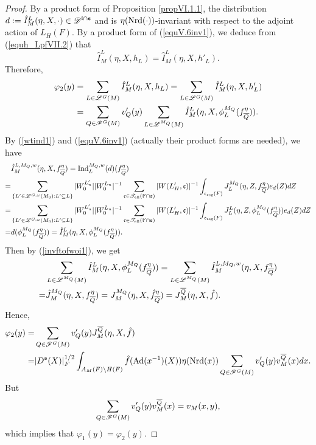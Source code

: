 \documentclass[a4paper]{amsart}
\newcommand{\ov}{\overline}
\theoremstyle{definition}
\theoremstyle{remark}
\numberwithin{equation}{subsection}
\begin{document}
\begin{proof}
By a product form of Proposition \ref{propVI.1.1}, the distribution $d:=\hat{I}_M^L(\eta, X, \cdot)\in\mathscr{D}^{{\mathfrak{l}}\cap{\mathfrak{s}}}$ and is $\eta({\mathrm{Nrd}}(\cdot))$-invariant with respect to the adjoint action of $L_H(F)$. By a product form of (\ref{equV.6inv1}), we deduce from (\ref{equh_LpfVII.2}) that
$$ \hat{I}_M^L(\eta, X, h_L)=\hat{I}_M^L(\eta, X, h'_L). $$
Therefore, 
\[\begin{split}
 \varphi_2(y)&=\sum_{L\in\msl^G(M)} \hat{I}_M^L(\eta, X, h_L)=\sum_{L\in\msl^G(M)} \hat{I}_M^L(\eta, X, h'_L) \\
&=\sum_{Q\in\msf^G(M)} v'_Q(y) \sum_{L\in\msl^{M_Q}(M)} \hat{I}_M^L(\eta, X, \phi_L^{M_Q}(f_{\ov{Q}}^\eta)). 
\end{split}\]
By (\ref{wtind1}) and (\ref{equV.6inv1}) (actually their product forms are needed), we have
\[\begin{split}
&\hat{I}_M^{L, M_Q, w}(\eta, X, f_{\ov{Q}}^\eta)=\Ind_L^{M_Q,w}(d)(f_{\ov{Q}}^\eta) \\
=&\sum_{\{L'\in\msl^{G,\omega}(M_0): L'\subseteq L\}} |W_0^{L'_n}| |W_0^{L_n}|^{-1} \sum_{\fc\in\mst_\el(\fl'\cap\fs)} |W(L'_H, \fc)|^{-1} \int_{\fc_\reg(F)} J_L^{M_Q}(\eta, Z, f_{\ov{Q}}^\eta) e_d(Z) dZ \\
=&\sum_{\{L'\in\msl^{G,\omega}(M_0): L'\subseteq L\}} |W_0^{L'_n}| |W_0^{L_n}|^{-1} \sum_{\fc\in\mst_\el(\fl'\cap\fs)} |W(L'_H, \fc)|^{-1} \int_{\fc_\reg(F)} J_L^L(\eta, Z, \phi_L^{M_Q}(f_{\ov{Q}}^\eta)) e_d(Z) dZ \\
=&d(\phi_L^{M_Q}(f_{\ov{Q}}^\eta))=\hat{I}_M^L(\eta, X, \phi_L^{M_Q}(f_{\ov{Q}}^\eta)). 
\end{split}\]
Then by (\ref{invftofwoi1}), we get
\[\begin{split}
 &\sum_{L\in\msl^{M_Q}(M)} \hat{I}_M^L(\eta, X, \phi_L^{M_Q}(f_{\ov{Q}}^\eta)) =\sum_{L\in\msl^{M_Q}(M)} \hat{I}_M^{L, M_Q, w}(\eta, X, f_{\ov{Q}}^\eta) \\ 
=&\hat{J}_M^{M_Q}(\eta, X, f_{\ov{Q}}^\eta)=J_M^{M_Q}(\eta, X, \hat{f}_{\ov{Q}}^\eta)=J_M^{\ov{Q}}(\eta, X, \hat{f}). 
\end{split}\]
Hence, 
\[\begin{split}
 \varphi_2(y)=&\sum_{Q\in\msf^G(M)} v'_Q(y) J_M^{\ov{Q}}(\eta, X, \hat{f}) \\
=&|D^\fs(X)|_F^{1/2} \int_{A_M(F)\bs H(F)} \hat{f}(\Ad(x^{-1})(X)) \eta(\Nrd(x)) \sum_{Q\in\msf^G(M)} v'_Q(y) v_M^{\ov{Q}}(x) dx. 
\end{split}\]
But
$$ \sum_{Q\in\msf^G(M)} v'_Q(y) v_M^{\ov{Q}}(x)=v_M(x,y), $$
which implies that $\varphi_1(y)=\varphi_2(y)$. 
\end{proof}
\end{document}
